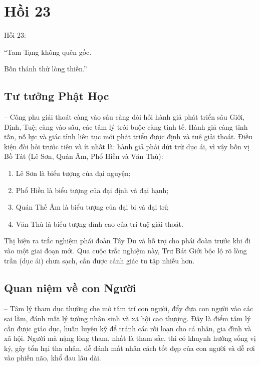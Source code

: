 \chapter{Hồi 23} %
\label{cha:hoi_23}

Hồi 23:

\begin{itshape}
``Tam Tạng không quên gốc.

Bốn thánh thử lòng thiền.''
\end{itshape}

\section{Tư tưởng Phật Học} %
\label{sec:23_phat_hoc}

-- Công phu giải thoát càng vào sâu càng đòi hỏi hành giả phát triển sâu Giới, Định, Tuệ; càng vào sâu, các tâm lý trói buộc càng tinh tế. Hành giả càng tinh tấn, nỗ lực và giác tỉnh liên tục mới phát triển được định và tuệ giải thoát. Điều kiện đòi hỏi trước tiên và ít nhất là: hành giả phải dứt trừ dục ái, vì vậy bốn vị Bồ Tát (Lê Sơn, Quán Âm, Phổ Hiền và Văn Thù):

\begin{enumerate}[label=\itshape\arabic*\upshape/]
   \item Lê Sơn là biểu tượng của đại nguyện;

   \item Phổ Hiền là biểu tượng của đại định và đại hạnh;

   \item Quán Thế Âm là biểu tượng của đại bi và đại trí;

   \item Văn Thù là biểu tượng đỉnh cao của trí tuệ giải thoát.
\end{enumerate}

Thị hiện ra trắc nghiệm phái đoàn Tây Du và hỗ trợ cho phái đoàn trước khi đi vào một giai đoạn mới. Qua cuộc trắc nghiệm này, Trư Bát Giới bộc lộ rõ lòng trần (dục ái) chưa sạch, cần được cảnh giác tu tập nhiều hơn.

\section{Quan niệm về con Người} %
\label{sec:23_con_nguoi}

-- Tâm lý tham dục thường che mờ tâm trí con người, đẩy đưa con người vào các sai lầm, đánh mất lý tưởng nhân sinh và xã hội cao thượng. Đây là điểm tâm lý cần được giáo dục, huấn luyện kỹ để tránh các rối loạn cho cá nhân, gia đình và xã hội. Người mà nặng lòng tham, nhất là tham sắc, thì có khuynh hướng sống vị kỷ, gây tổn hại tha nhân, dễ đánh mất nhân cách tốt đẹp của con người và dễ rơi vào phiền não, khổ đau lâu dài.

